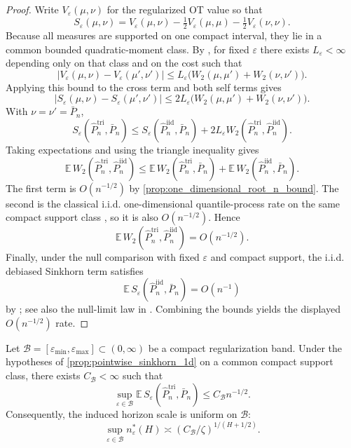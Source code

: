 \begin{proof}
Write $V_{\varepsilon}(\mu,\nu)$ for the regularized OT value so that
\[
  S_{\varepsilon}(\mu,\nu)
  = V_{\varepsilon}(\mu,\nu)
  - \tfrac12 V_{\varepsilon}(\mu,\mu)
  - \tfrac12 V_{\varepsilon}(\nu,\nu).
\]
Because all measures are supported on one compact interval, they lie in a
common bounded quadratic-moment class. By \citet[Thm.~3.7(ii), Ex.~3.4]{EcksteinNutz2022},
for fixed $\varepsilon$ there exists $L_{\varepsilon}<\infty$ depending only on
that class and on the cost such that
\[
  |V_{\varepsilon}(\mu,\nu)-V_{\varepsilon}(\mu',\nu')|
  \le L_{\varepsilon}\bigl(W_2(\mu,\mu')+W_2(\nu,\nu')\bigr).
\]
Applying this bound to the cross term and both self terms gives
\[
  |S_{\varepsilon}(\mu,\nu)-S_{\varepsilon}(\mu',\nu')|
  \le 2L_{\varepsilon}\bigl(W_2(\mu,\mu')+W_2(\nu,\nu')\bigr).
\]
With $\nu=\nu'=\bar P_n$,
\[
  S_{\varepsilon}\!\left(\widehat P_n^{\mathrm{tri}},\bar P_n\right)
  \le
  S_{\varepsilon}\!\left(\widehat P_n^{\mathrm{iid}},\bar P_n\right)
  + 2L_{\varepsilon}
    W_2\!\left(\widehat P_n^{\mathrm{tri}},\widehat P_n^{\mathrm{iid}}\right).
\]
Taking expectations and using the triangle inequality gives
\[
  \mathbb E\,W_2\!\left(\widehat P_n^{\mathrm{tri}},\widehat P_n^{\mathrm{iid}}\right)
  \le
  \mathbb E\,W_2\!\left(\widehat P_n^{\mathrm{tri}},\bar P_n\right)
  + \mathbb E\,W_2\!\left(\widehat P_n^{\mathrm{iid}},\bar P_n\right).
\]
The first term is $O(n^{-1/2})$ by \cref{prop:one_dimensional_root_n_bound}. The second is
the classical i.i.d. one-dimensional quantile-process rate on the same compact
support class \citep{Bahadur1966,vanDerVaart1998}, so it is also
$O(n^{-1/2})$. Hence
\[
  \mathbb E\,W_2\!\left(\widehat P_n^{\mathrm{tri}},\widehat P_n^{\mathrm{iid}}\right)
  = O(n^{-1/2}).
\]
Finally, under the null comparison with fixed $\varepsilon$ and compact support,
the i.i.d. debiased Sinkhorn term satisfies
\[
  \mathbb E\,S_{\varepsilon}\!\left(\widehat P_n^{\mathrm{iid}},\bar P_n\right)
  = O(n^{-1})
\]
by \citet[Thm.~5.1, after fixed-$\varepsilon$ rescaling]{delBarrioEtAl2023}; see also the null-limit law in
\citet{GoldfeldEtAl2022}. Combining the bounds yields the displayed
$O(n^{-1/2})$ rate.
\end{proof}

\begin{proposition}
\label{prop:bandwise_sinkhorn_1d}
Let $\mathcal B=[\varepsilon_{\min},\varepsilon_{\max}]\subset(0,\infty)$ be a
compact regularization band. Under the hypotheses of
\cref{prop:pointwise_sinkhorn_1d} on a common compact support class, there exists
$C_{\mathcal B}<\infty$ such that
\[
  \sup_{\varepsilon\in\mathcal B}
  \mathbb E\,S_{\varepsilon}\!\left(\widehat P_n^{\mathrm{tri}},\bar P_n\right)
  \le C_{\mathcal B} n^{-1/2}.
\]
Consequently, the induced horizon scale is uniform on $\mathcal B$:
\[
  \sup_{\varepsilon\in\mathcal B} n_{\varepsilon}^*(H)
  \asymp (C_{\mathcal B}/\zeta)^{1/(H+1/2)}.
\]
\end{proposition}

